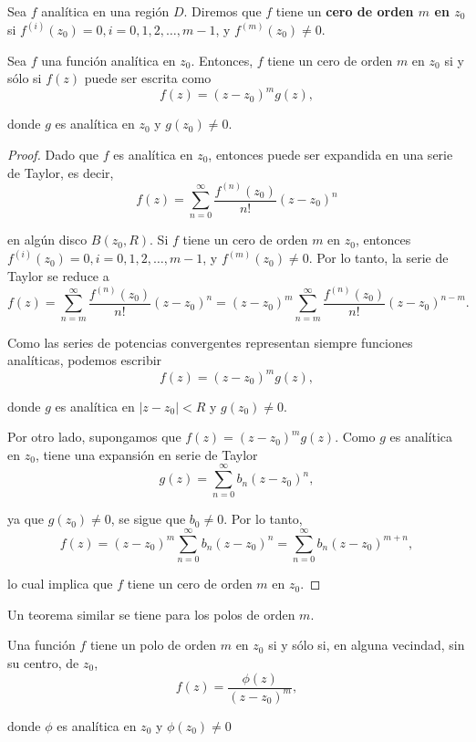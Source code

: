 \begin{defi}
Sea $f$ analítica en una región $D$. Diremos que $f$ tiene un \textbf{cero de orden $m$ en $z_0$} si $f^{(i)}(z_0) = 0, i = 0,1,2, \dots, m-1$, y $f^{(m)}(z_0) \neq 0$.
\end{defi}

\begin{teorema} \label{TeoCerOrdenm}
Sea $f$ una función analítica en $z_0$. Entonces, $f$ tiene un cero de orden $m$ en $z_0$ si y sólo si $f(z)$ puede ser escrita como
\begin{equation}
 f(z) = (z-z_0)^m g(z),   \label{CerosOrdenm}
\end{equation}

donde $g$ es analítica en $z_0$ y $g(z_0) \neq 0$.
\end{teorema}

\begin{proof}
Dado que $f$ es analítica en $z_0$, entonces puede ser expandida en una serie de Taylor, es decir,
$$f(z) = \sum_{n=0}^{\infty} \frac{f^{(n)}(z_0)}{n!} (z-z_0)^n$$

en algún disco $B(z_0,R)$. Si $f$ tiene un cero de orden $m$ en $z_0$, entonces $f^{(i)}(z_0) = 0, i = 0,1,2, \dots, m-1$, y $f^{(m)}(z_0) \neq 0$. Por lo tanto, la serie de Taylor se reduce a 
$$f(z) = \sum_{n=m}^{\infty} \frac{f^{(n)}(z_0)}{n!} (z-z_0)^n = (z-z_0)^m \sum_{n=m}^{\infty} \frac{f^{(n)}(z_0)}{n!} (z-z_0)^{n-m}.$$

Como las series de potencias convergentes representan siempre funciones analíticas, podemos escribir
$$f(z) = (z-z_0)^m g(z),$$

donde $g$ es analítica en $|z-z_0| < R$ y $g(z_0) \neq 0$.

Por otro lado, supongamos que $f(z) = (z-z_0)^m g(z)$. Como $g$ es analítica en $z_0$, tiene una expansión en serie de Taylor 
$$g(z) = \sum_{n=0}^{\infty} b_n (z-z_0)^n,$$

ya que $g(z_0) \neq 0$, se sigue que $b_0 \neq 0$. Por lo tanto,
$$f(z) =  (z-z_0)^m  \sum_{n=0}^{\infty} b_n (z-z_0)^n = \sum_{n=0}^{\infty} b_n (z-z_0)^{m+n},$$

lo cual implica que $f$ tiene un cero de orden $m$ en $z_0$.

\end{proof}

Un teorema similar se tiene para los polos de orden $m$.

\begin{teorema} \label{TeoPoloOrdenm}
Una función $f$ tiene un polo de orden $m$ en $z_0$ si y sólo si, en alguna vecindad, sin su centro, de $z_0$,
\begin{equation}
f(z) = \frac{\phi(z)}{(z-z_0)^m},    \label{PoloOrdenm}
\end{equation}

donde $\phi$ es analítica en $z_0$ y $\phi(z_0) \neq 0$
\end{teorema}

